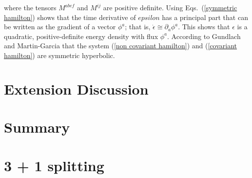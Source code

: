 \documentclass[letterpaper,nofootinbib,prd,amsmath,onecolumn]{revtex4-1}
\begin{document}
where the tensors $M^{abef}$ and $M^{ij}$ are positive definite. Using Eqs.~(\ref{symmetric hamilton}) shows that the time derivative of $epsilon$ has a principal part that can be written as the gradient of a vector $\phi^{a}$; that is, ${\dot \epsilon} \cong \partial_{a}\phi^{a}$. This shows that $\epsilon$ is a quadratic, positive-definite energy density with flux $\phi^{a}$. According to Gundlach and Martin-Garcia\cite{Gundlach:2005ta} that the system (\ref{non covariant hamilton})  and (\ref{covariant hamilton}) are symmetric hyperbolic. 
\section{Extension Discussion}\label{extension}
\section{Summary}\label{summary}
\appendix
\section{3 + 1 splitting}\label{3 + 1}


\end{document}
